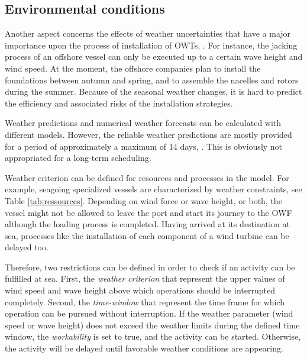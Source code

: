 \subsection{Environmental conditions}
Another aspect concerns the effects of weather uncertainties that have a major importance upon the process of installation of OWTs, \cite{COMPIT11}. For instance, the jacking process of an offshore vessel can only be executed up to a certain wave height and wind speed. At the moment, the offshore companies plan to install the foundations between autumn and spring, and to assemble the nacelles and rotors during the summer. Because of the seasonal weather changes, it is hard to predict the efficiency and associated risks of the installation strategies.

Weather predictions and numerical weather forecasts can be calculated with different models. However, the reliable weather predictions are mostly provided for a period of approximately a maximum of 14 days, \cite{Hinnenthal_2010}. This is obviously not appropriated for a long-term scheduling.

Weather criterion can be defined for resources and processes in the model. For example, seagoing specialized vessels are characterized by weather constraints, see Table \ref{tab:ressources}. Depending on wind force or wave height, or both, the vessel might not be allowed to leave the port and start its journey to the OWF although the loading process is completed. Having arrived at its destination at sea, processes like the installation of each component of a wind turbine can be delayed too.

Therefore, two restrictions can be defined in order to check if an activity can be fulfilled at sea. First, the \textit{weather criterion} that represent the upper values of wind speed and wave height above which operations should be interrupted completely. Second, the \textit{time-window} that represent the time frame for which operation can be pursued without interruption.  If the weather parameter (wind speed or wave height) does not exceed the weather limits during the defined time window, the \textit{workability} is set to true, and the activity can be started. Otherwise, the activity will be delayed until favorable weather conditions are appearing.

